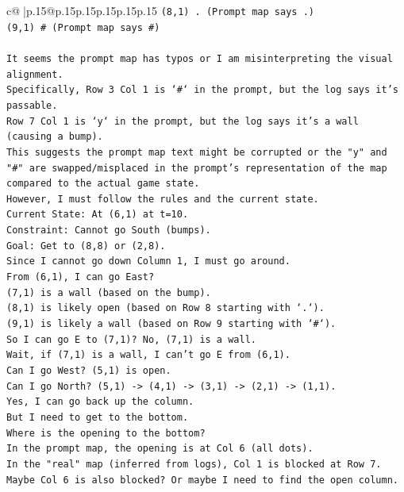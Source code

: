 \documentclass{article}
\begin{document}
{\begin{supertabular}{c@{$\;$}|p{.15\linewidth}@{}p{.15\linewidth}p{.15\linewidth}p{.15\linewidth}p{.15\linewidth}p{.15\linewidth}}
{{{\texttt{(8,1) . (Prompt map says .)} \\
\texttt{(9,1) \# (Prompt map says \#)} \\
\\ 
\texttt{It seems the prompt map has typos or I am misinterpreting the visual alignment.} \\
\texttt{Specifically, Row 3 Col 1 is `\#` in the prompt, but the log says it's passable.} \\
\texttt{Row 7 Col 1 is `y` in the prompt, but the log says it's a wall (causing a bump).} \\
\texttt{This suggests the prompt map text might be corrupted or the "y" and "\#" are swapped/misplaced in the prompt's representation of the map compared to the actual game state.} \\
\texttt{However, I must follow the rules and the current state.} \\
\texttt{Current State: At (6,1) at t=10.} \\
\texttt{Constraint: Cannot go South (bumps).} \\
\texttt{Goal: Get to (8,8) or (2,8).} \\
\texttt{Since I cannot go down Column 1, I must go around.} \\
\texttt{From (6,1), I can go East?} \\
\texttt{(7,1) is a wall (based on the bump).} \\
\texttt{(8,1) is likely open (based on Row 8 starting with `.`).} \\
\texttt{(9,1) is likely a wall (based on Row 9 starting with `\#`).} \\
\texttt{So I can go E to (7,1)? No, (7,1) is a wall.} \\
\texttt{Wait, if (7,1) is a wall, I can't go E from (6,1).} \\
\texttt{Can I go West? (5,1) is open.} \\
\texttt{Can I go North? (5,1) {-}> (4,1) {-}> (3,1) {-}> (2,1) {-}> (1,1).} \\
\texttt{Yes, I can go back up the column.} \\
\texttt{But I need to get to the bottom.} \\
\texttt{Where is the opening to the bottom?} \\
\texttt{In the prompt map, the opening is at Col 6 (all dots).} \\
\texttt{In the "real" map (inferred from logs), Col 1 is blocked at Row 7.} \\
\texttt{Maybe Col 6 is also blocked? Or maybe I need to find the open column.} \\
}}}
\end{supertabular}}
\end{document}
